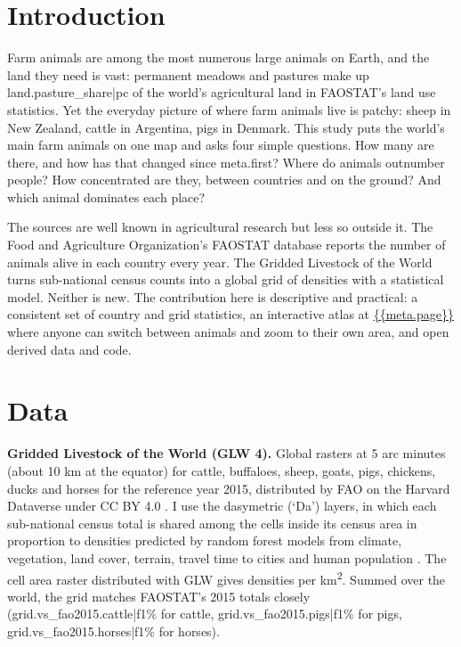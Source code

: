 \documentclass[11pt,a4paper]{article}
\begin{document}
\section{Introduction}
Farm animals are among the most numerous large animals on Earth, and the land they need is vast: permanent meadows and pastures make up {{land.pasture_share|pc}} of the world's agricultural land in FAOSTAT's land use statistics. Yet the everyday picture of where farm animals live is patchy: sheep in New Zealand, cattle in Argentina, pigs in Denmark. This study puts the world's main farm animals on one map and asks four simple questions. How many are there, and how has that changed since {{meta.first}}? Where do animals outnumber people? How concentrated are they, between countries and on the ground? And which animal dominates each place?

The sources are well known in agricultural research but less so outside it. The Food and Agriculture Organization's FAOSTAT database \citep{faostat} reports the number of animals alive in each country every year. The Gridded Livestock of the World \citep{gilbert2018,nicolas2016,robinson2014} turns sub-national census counts into a global grid of densities with a statistical model. Neither is new. The contribution here is descriptive and practical: a consistent set of country and grid statistics, an interactive atlas at \url{{{meta.page}}} where anyone can switch between animals and zoom to their own area, and open derived data and code.

\section{Data}
\textbf{Gridded Livestock of the World (GLW 4).} Global rasters at 5 arc minutes (about 10 km at the equator) for cattle, buffaloes, sheep, goats, pigs, chickens, ducks and horses for the reference year 2015, distributed by FAO on the Harvard Dataverse under CC BY 4.0 \citep{glw4}. I use the dasymetric (`Da') layers, in which each sub-national census total is shared among the cells inside its census area in proportion to densities predicted by random forest models from climate, vegetation, land cover, terrain, travel time to cities and human population \citep{nicolas2016,gilbert2018}. The cell area raster distributed with GLW gives densities per km\textsuperscript{2}. Summed over the world, the grid matches FAOSTAT's 2015 totals closely ({{grid.vs_fao2015.cattle|f1}}\% for cattle, {{grid.vs_fao2015.pigs|f1}}\% for pigs, {{grid.vs_fao2015.horses|f1}}\% for horses).
\end{document}
